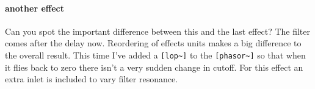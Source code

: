 \paragraph{another effect}
Can you spot the important difference between this and the last effect?
The filter comes after the delay now. Reordering of
effects units makes a big difference to the overall result. This time
I've added a \verb+[lop~]+ to the \verb+[phasor~]+ so that when it
flies back to zero there isn't a very sudden change in cutoff. For this effect
an extra inlet is included to vary filter resonance.